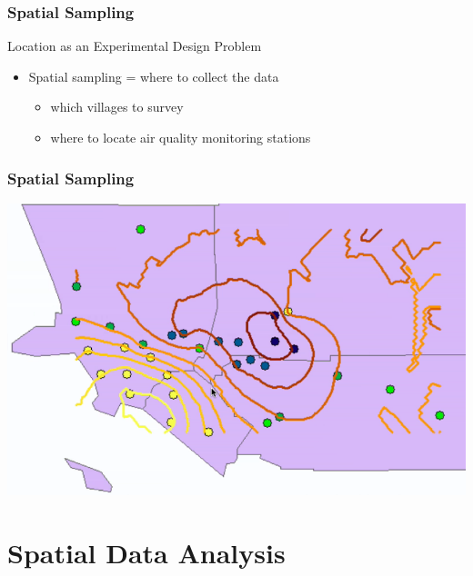 \documentclass[nototal,handout]{beamer}
\begin{document}
   \begin{frame}
     \frametitle{Spatial Sampling}
     \begin{block}{Location as an Experimental Design Problem}
       \begin{itemize}
	 \item Spatial sampling = where to collect the data
	   \begin{itemize}
	     \item which villages to survey
	     \item where to locate air quality monitoring stations
	   \end{itemize}
       \end{itemize}
      \end{block}
    \end{frame}


    \begin{frame}
      \frametitle{Spatial Sampling}
      \begin{center}
	\includegraphics[width=.65\linewidth]{laozone.png}
      \end{center}
    \end{frame}

\section{Spatial Data Analysis} 
\end{document}
